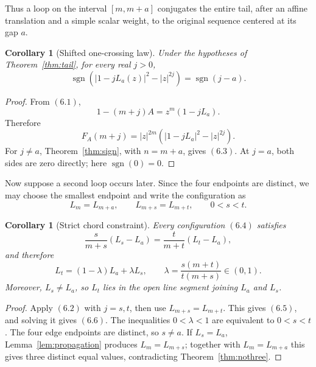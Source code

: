 \documentclass[11pt]{article}
\newtheorem{corollary}[theorem]{Corollary}
\theoremstyle{definition}
\begin{document}
Thus a loop on the interval \([m,m+a]\) conjugates the entire tail, after an
affine translation and a simple scalar weight, to the original sequence
centered at its gap \(a\).

\begin{corollary}[Shifted one-crossing law]\label{cor:shiftedsign}
Under the hypotheses of Theorem~\ref{thm:tail}, for every real \(j>0\),
\begin{equation}
 \operatorname{sgn}
 \left(|1-jL_a(z)|^2-|z|^{2j}\right)
 =\operatorname{sgn}(j-a).
 \tag{6.3}
\end{equation}
\end{corollary}

\begin{proof}
From \((6.1)\),
\[
 1-(m+j)A=z^m(1-jL_a).
\]
Therefore
\[
 F_A(m+j)=|z|^{2m}
 \left(|1-jL_a|^2-|z|^{2j}\right).
\]
For \(j\neq a\), Theorem~\ref{thm:sign}, with \(n=m+a\), gives
\((6.3)\).  At \(j=a\), both sides are zero directly; here
\(\operatorname{sgn}(0)=0\).
\end{proof}

Now suppose a second loop occurs later.  Since the four endpoints are distinct,
we may choose the smallest endpoint and write the configuration as
\begin{equation}
 L_m=L_{m+a},
 \qquad
 L_{m+s}=L_{m+t},
 \qquad 0<s<t.
 \tag{6.4}
\end{equation}

\begin{corollary}[Strict chord constraint]\label{cor:chord}
Every configuration \((6.4)\) satisfies
\begin{equation}
 \frac{s}{m+s}(L_s-L_a)
 =\frac{t}{m+t}(L_t-L_a),
 \tag{6.5}
\end{equation}
and therefore
\begin{equation}
 L_t=(1-\lambda)L_a+\lambda L_s,
 \qquad
 \lambda=\frac{s(m+t)}{t(m+s)}\in(0,1).
 \tag{6.6}
\end{equation}
Moreover, \(L_s\neq L_a\), so \(L_t\) lies in the open line segment joining
\(L_a\) and \(L_s\).
\end{corollary}

\begin{proof}
Apply \((6.2)\) with \(j=s,t\), then use
\(L_{m+s}=L_{m+t}\).  This gives \((6.5)\), and solving it gives
\((6.6)\).  The inequalities \(0<\lambda<1\) are equivalent to \(0<s<t\).
The four edge endpoints are distinct, so \(s\neq a\).  If
\(L_s=L_a\), Lemma~\ref{lem:propagation} produces
\(L_m=L_{m+s}\); together with \(L_m=L_{m+a}\) this gives three
distinct equal values, contradicting Theorem~\ref{thm:nothree}.
\end{proof}
\end{document}
